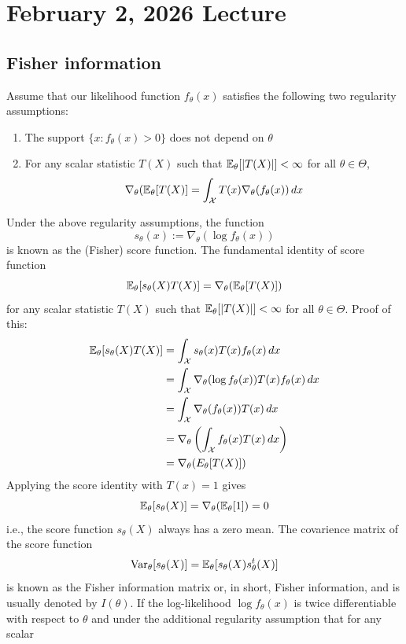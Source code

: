 \documentclass[11pt]{book}
\begin{document}

\newcommand{\Cov}{\mathrm{Cov}}

\theoremstyle{definition}
\newtheorem{exmp}{Example}[section]

\chapter{February 2, 2026 Lecture}
\section{Fisher information}
Assume that our likelihood function $f_\theta(x)$ satisfies the following two regularity assumptions:
\begin{enumerate}
	\item The support $\{x : f_\theta(x) > 0 \}$ does not depend on $\theta$
	\item For any scalar statistic $T(X)$ such that $\mathbb{E}_\theta[|T(X)|] < \infty$ for all $\theta \in \Theta$,
		\[ 
			\nabla_\theta (\mathbb{E}_\theta[T(X)] = \int_{\mathcal{X}} T(x) \nabla_\theta (f_\theta(x)) \, dx
		\]
\end{enumerate}
Under the above regularity assumptions, the function 
\[
  s_\theta(x) := \nabla_\theta(\log f_\theta(x))
\]
is known as the (Fisher) score function. The fundamental identity of score function 
\[
  \mathbb{E}_\theta[s_\theta(X)T(X)] = \nabla_\theta(\mathbb{E}_\theta[T(X)])
\]
for any scalar statistic $T(X)$ such that $\mathbb{E}_\theta[|T(X)|] < \infty$ for all $\theta \in \Theta$. Proof of this:
\begin{align*}
  \mathbb{E}_\theta[s_\theta(X)T(X)] &= \int_{\mathcal{X}} s_\theta(x)T(x)f_\theta(x) \, dx \\ 
  &= \int_{\mathcal{X}} \nabla_\theta (\log f_\theta(x)) T(x) f_\theta(x) \, dx \\ 
  &= \int_{\mathcal{X}} \nabla_\theta(f_\theta(x)) T(x) \, dx \\ 
  &= \nabla_\theta \left( \int_{\mathcal{X}} f_\theta(x) T(x) \, dx \right) \\ 
  &= \nabla_\theta (E_\theta[T(X)])
\end{align*}
Applying the score identity with $T(x) = 1$ gives 
\[ 
  \mathbb{E}_\theta[s_\theta(X)] = \nabla_\theta (\mathbb{E}_\theta[1]) = 0 
\] 
i.e., the score function $s_\theta(X)$ always has a zero mean. The covarience matrix of the score function 
\[
  \operatorname{Var}_\theta[s_\theta(X)] = \mathbb{E}_\theta[s_\theta(X)s_\theta^t (X)]
\] 
is known as the Fisher information matrix or, in short, Fisher information, and is usually denoted by $I(\theta)$. If the log-likelihood $\log f_\theta(x)$ is twice differentiable with respect to $\theta$ and under the additional regularity assumption that for any scalar
\end{document}
